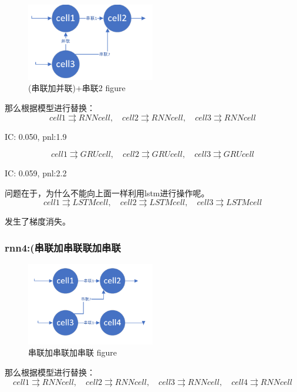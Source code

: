 \documentclass[11pt]{ctexart}
\begin{document}
\begin{figure}[H]
\begin{center}
\includegraphics[width=0.5\textwidth]{rnn3.PNG}
\end{center}
\caption{(串联加并联)+串联2 figure}
\label{FIG.22}
\end{figure}
那么根据模型进行替换：
$$cell1 \rightrightarrows RNNcell, \quad cell2 \rightrightarrows RNNcell, \quad cell3 \rightrightarrows RNNcell$$

{\kaishu \small IC: 0.050, pnl:1.9}

$$cell1 \rightrightarrows GRUcell, \quad cell2 \rightrightarrows GRUcell, \quad cell3 \rightrightarrows GRUcell$$

{\kaishu \small IC: 0.059, pnl:2.2}

问题在于，为什么不能向上面一样利用lstm进行操作呢。
$$cell1 \rightrightarrows LSTMcell, \quad cell2 \rightrightarrows LSTMcell, \quad cell3 \rightrightarrows LSTMcell$$

发生了梯度消失。

\subsubsection{rnn4:(串联加串联联加串联}

\begin{figure}[H]
\begin{center}
\includegraphics[width=0.5\textwidth]{rnn4.PNG}
\end{center}
\caption{串联加串联加串联 figure}
\label{FIG.23}
\end{figure}
那么根据模型进行替换：
$$cell1 \rightrightarrows RNNcell, \quad cell2 \rightrightarrows RNNcell, \quad cell3 \rightrightarrows RNNcell, \quad cell4 \rightrightarrows RNNcell$$
\end{document}
